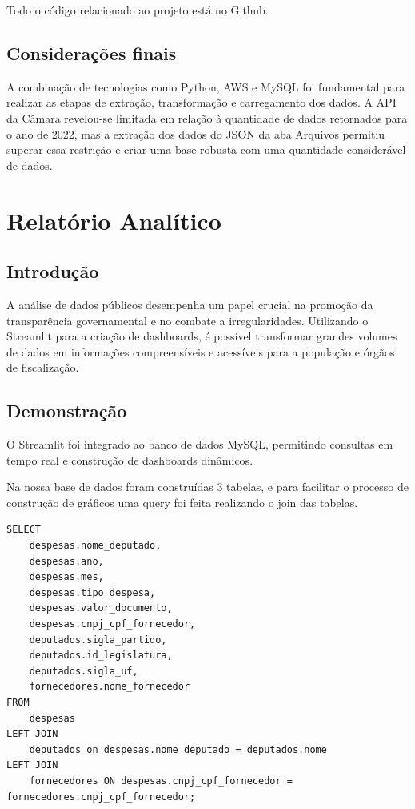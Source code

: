 \documentclass[12pt, a4paper]{article}
\begin{document}
Todo o código relacionado ao projeto está no Github\cite{github_repo}.

\subsection{Considerações finais}

A combinação de tecnologias como Python, AWS e MySQL foi fundamental para realizar as etapas de extração, transformação e carregamento dos dados. A API da Câmara revelou-se limitada em relação à quantidade de dados retornados para o ano de 2022, mas a extração dos dados do JSON da aba Arquivos permitiu superar essa restrição e criar uma base robusta com uma quantidade considerável de dados.

\section{Relatório Analítico}

\subsection{Introdução}

A análise de dados públicos desempenha um papel crucial na promoção da transparência governamental e no combate a irregularidades. Utilizando o Streamlit para a criação de dashboards, é possível transformar grandes volumes de dados em informações compreensíveis e acessíveis para a população e órgãos de fiscalização.

\subsection{Demonstração}

O Streamlit foi integrado ao banco de dados MySQL, permitindo consultas em tempo real e construção de dashboards dinâmicos.

Na nossa base de dados foram construídas 3 tabelas, e para facilitar o processo de construção de gráficos uma query foi feita realizando o join das tabelas.

\begin{verbatim}
SELECT
	despesas.nome_deputado,
	despesas.ano,
	despesas.mes,
	despesas.tipo_despesa,
	despesas.valor_documento,
	despesas.cnpj_cpf_fornecedor,
	deputados.sigla_partido,
	deputados.id_legislatura,
	deputados.sigla_uf,
	fornecedores.nome_fornecedor
FROM
	despesas
LEFT JOIN
	deputados on despesas.nome_deputado = deputados.nome
LEFT JOIN
	fornecedores ON despesas.cnpj_cpf_fornecedor = fornecedores.cnpj_cpf_fornecedor;
\end{verbatim}
\end{document}
